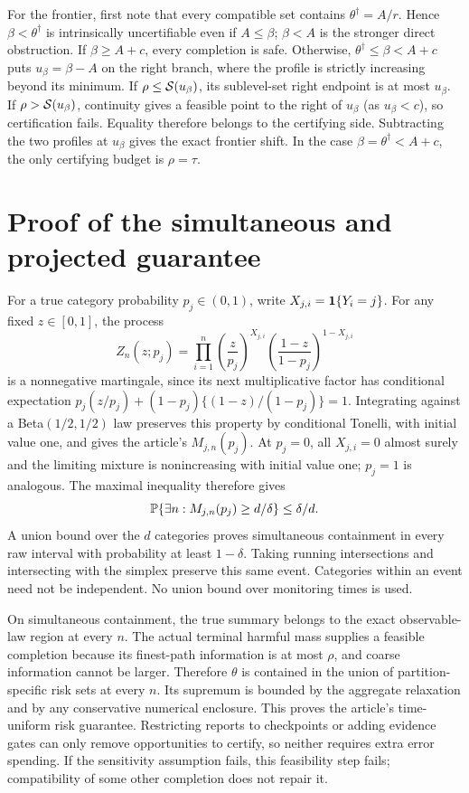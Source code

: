 For the frontier, first note that every compatible set contains $\theta^\dagger=A/r$. Hence $\beta<\theta^\dagger$ is intrinsically uncertifiable even if $A\le\beta$; $\beta<A$ is the stronger direct obstruction. If $\beta\ge A+c$, every completion is safe. Otherwise, $\theta^\dagger\le\beta<A+c$ puts $u_\beta=\beta-A$ on the right branch, where the profile is strictly increasing beyond its minimum. If $\rho\le\mathcal S(u_\beta)$, its sublevel-set right endpoint is at most $u_\beta$. If $\rho>\mathcal S(u_\beta)$, continuity gives a feasible point to the right of $u_\beta$ (as $u_\beta<c$), so certification fails. Equality therefore belongs to the certifying side. Subtracting the two profiles at $u_\beta$ gives the exact frontier shift. In the case $\beta=\theta^\dagger<A+c$, the only certifying budget is $\rho=\tau$.

\section{Proof of the simultaneous and projected guarantee}
For a true category probability $p_j\in(0,1)$, write $X_{j,i}=\mathbf 1\{Y_i=j\}$. For any fixed $z\in[0,1]$, the process
\begin{equation}
 Z_n(z;p_j)=\prod_{i=1}^n
 \left(\frac z{p_j}\right)^{X_{j,i}}
 \left(\frac{1-z}{1-p_j}\right)^{1-X_{j,i}}
\end{equation}
is a nonnegative martingale, since its next multiplicative factor has conditional expectation $p_j(z/p_j)+(1-p_j)\{(1-z)/(1-p_j)\}=1$. Integrating against a Beta$(1/2,1/2)$ law preserves this property by conditional Tonelli, with initial value one, and gives the article's $M_{j,n}(p_j)$. At $p_j=0$, all $X_{j,i}=0$ almost surely and the limiting mixture is nonincreasing with initial value one; $p_j=1$ is analogous. The maximal inequality therefore gives
\begin{equation}
 \mathbb P\{\exists n:M_{j,n}(p_j)\ge d/\delta\}\le\delta/d.
\end{equation}
A union bound over the $d$ categories proves simultaneous containment in every raw interval with probability at least $1-\delta$. Taking running intersections and intersecting with the simplex preserve this same event. Categories within an event need not be independent. No union bound over monitoring times is used.

On simultaneous containment, the true summary belongs to the exact observable-law region at every $n$. The actual terminal harmful mass supplies a feasible completion because its finest-path information is at most $\rho$, and coarse information cannot be larger. Therefore $\theta$ is contained in the union of partition-specific risk sets at every $n$. Its supremum is bounded by the aggregate relaxation and by any conservative numerical enclosure. This proves the article's time-uniform risk guarantee. Restricting reports to checkpoints or adding evidence gates can only remove opportunities to certify, so neither requires extra error spending. If the sensitivity assumption fails, this feasibility step fails; compatibility of some other completion does not repair it.

